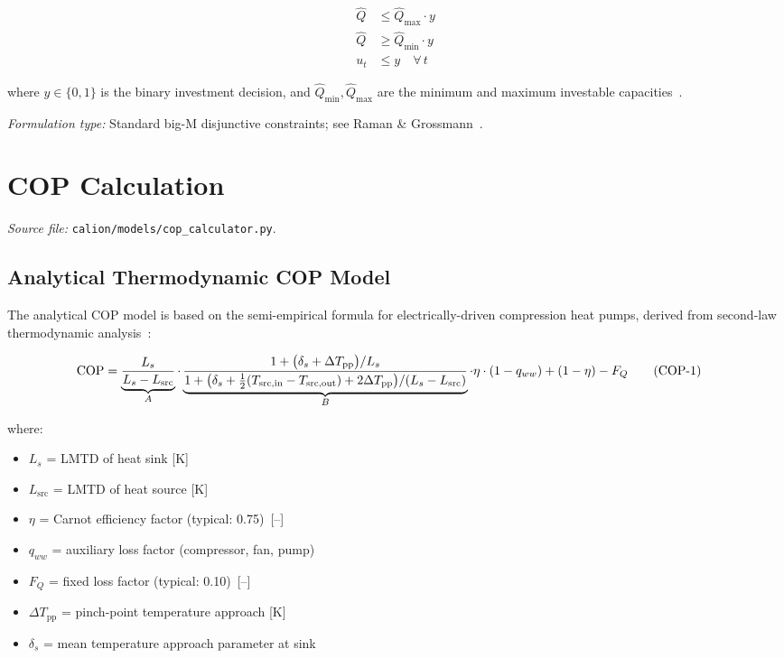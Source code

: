 \documentclass[a4paper,12pt]{article}
\newcommand{\COP}{\mathrm{COP}}
\begin{document}
\begin{align}
  \hat{Q} &\leq \hat{Q}_{\max} \cdot y
  \tag{HP-5}
  \label{eq:hp5} \\
  \hat{Q} &\geq \hat{Q}_{\min} \cdot y
  \tag{HP-6}
  \label{eq:hp6} \\
  u_{t}   &\leq y \quad \forall\, t
  \tag{HP-7}
  \label{eq:hp7}
\end{align}

where $y \in \{0,1\}$ is the binary investment decision, and
$\hat{Q}_{\min}, \hat{Q}_{\max}$ are the minimum and maximum investable
capacities~\cite{Morales2014,Morvaj2016}.

\noindent\textit{Formulation type:} Standard big-M disjunctive constraints; see
Raman \& Grossmann~\cite{Raman1994}.

\section{COP Calculation}
\label{sec:cop}

\textit{Source file:} \texttt{calion/models/cop\_calculator.py}.

\subsection{Analytical Thermodynamic COP Model}

The analytical COP model is based on the semi-empirical formula for electrically-driven
compression heat pumps, derived from second-law thermodynamic
analysis~\cite{Staffell2012,Ruhnau2019}:

\begin{align}
  \COP
  &= \underbrace{%
       \frac{L_s}{L_s - L_{\text{src}}}
     }_{A}
     \cdot
     \underbrace{%
       \frac{%
         1 + \bigl(\delta_s + \Delta T_{\text{pp}}\bigr) / L_s
       }{%
         1 + \bigl(\delta_s + \tfrac{1}{2}(T_{\text{src,in}} - T_{\text{src,out}})
             + 2\Delta T_{\text{pp}}\bigr)
             / (L_s - L_{\text{src}})
       }
     }_{B}
     \cdot \eta \cdot (1 - q_{ww})
     + (1 - \eta) - F_{Q}
  \tag{COP-1}
  \label{eq:cop1}
\end{align}

\noindent where:
\begin{itemize}
  \item $L_s$ = LMTD of heat sink [K]
  \item $L_{\text{src}}$ = LMTD of heat source [K]
  \item $\eta$ = Carnot efficiency factor (typical: 0.75)~[--]
  \item $q_{ww}$ = auxiliary loss factor (compressor, fan, pump)
  \item $F_Q$ = fixed loss factor (typical: 0.10)~[--]
  \item $\Delta T_{\text{pp}}$ = pinch-point temperature approach [K]
  \item $\delta_s$ = mean temperature approach parameter at sink
\end{itemize}
\end{document}
